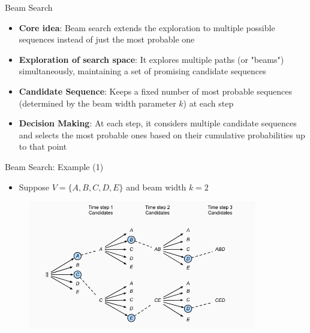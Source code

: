 
\begin{vbframe}{Beam Search}
\href{https://codelabsacademy.com/blog/the-beam-search-algorithm-in-the-context-of-natural-language-processing-and-sequence-generation-tasks}{}

\vfill

\begin{itemize}
    \item \textbf{Core idea}: Beam search extends the exploration to multiple possible sequences instead of just the most probable one
    \item \textbf{Exploration of search space}: It explores multiple paths (or "beams") simultaneously, maintaining a set of promising candidate sequences
    \item \textbf{Candidate Sequence}: Keeps a fixed number of most probable sequences (determined by the beam width parameter $k$) at each step
    \item \textbf{Decision Making}: At each step, it considers multiple candidate sequences and selects the most probable ones based on their cumulative probabilities up to that point
\end{itemize}

\vfill

\end{vbframe}


\begin{vbframe}{Beam Search: Example (1)}
\href{https://d2l.ai/chapter_recurrent-modern/beam-search.html}{}

\vfill

\begin{itemize}
    \item Suppose $V = \{A, B, C, D, E\}$ and beam width $k=2$
\end{itemize}

\begin{figure}
    \centering
    \includegraphics[width=10cm]{figure/beam.png}
\end{figure}

\vfill
    
\end{vbframe}

